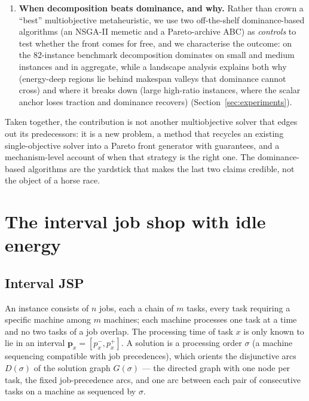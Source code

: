 \documentclass[preprint,12pt]{elsarticle}
\begin{document}
\begin{enumerate}
neighbourhood; the metaheuristic realisation inherits the structure, not an
approximation bound.
\item \textbf{When decomposition beats dominance, and why.} Rather than
crown a ``best'' multiobjective metaheuristic, we use two off-the-shelf
dominance-based algorithms (an NSGA-II memetic and a Pareto-archive ABC) as
\emph{controls} to test whether the front comes for free, and we characterise
the outcome: on the 82-instance benchmark decomposition dominates on small
and medium instances and in aggregate, while a landscape analysis explains
both why (energy-deep regions lie behind makespan valleys that dominance
cannot cross) and where it breaks down (large high-ratio instances, where the
scalar anchor loses traction and dominance recovers)
(Section~\ref{sec:experiments}).
\end{enumerate}

Taken together, the contribution is not another multiobjective solver that
edges out its predecessors: it is a new problem, a method that recycles an
existing single-objective solver into a Pareto front generator with
guarantees, and a mechanism-level account of when that strategy is the right
one. The dominance-based algorithms are the yardstick that makes the last two
claims credible, not the object of a horse race.

\section{The interval job shop with idle energy}
\label{sec:problem}

\subsection{Interval JSP}

An instance consists of $n$ jobs, each a chain of $m$ tasks, every task
requiring a specific machine among $m$ machines; each machine processes one
task at a time and no two tasks of a job overlap. The processing time of
task $x$ is only known to lie in an interval
$\mathbf{p}_x=[p^-_x,p^+_x]$. A solution is a processing order $\sigma$ (a
machine sequencing compatible with job precedences), which orients the
disjunctive arcs $D(\sigma)$ of the solution graph $G(\sigma)$ --- the
directed graph with one node per task, the fixed job-precedence arcs, and
one arc between each pair of consecutive tasks on a machine as sequenced by
$\sigma$.
\end{document}
